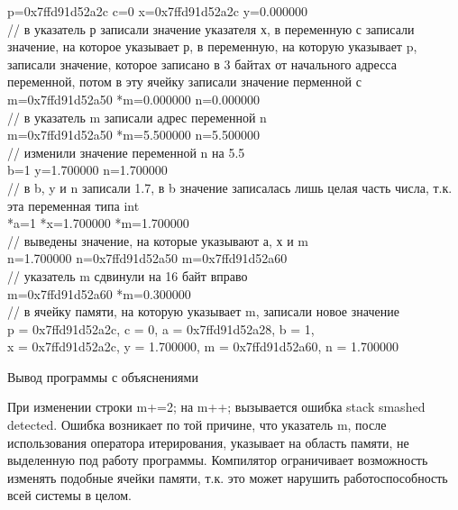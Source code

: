 \documentclass[a4paper,14pt]{extarticle}
\begin{document}
\begin{footnotesize}
p=0x7ffd91d52a2c	c=0	x=0x7ffd91d52a2c	y=0.000000\\
// в указатель р записали значение указателя х, в переменную с записали значение, на которое указывает р, в переменную, на которую указывает p, записали значение, которое записано в 3 байтах от начального адресса переменной, потом в эту ячейку записали значение перменной с\\
m=0x7ffd91d52a50	*m=0.000000	n=0.000000\\
// в указатель m записали адрес переменной n\\
m=0x7ffd91d52a50	*m=5.500000	n=5.500000\\
// изменили значение переменной n на 5.5\\
b=1	y=1.700000	n=1.700000\\
// в b, y и n записали 1.7, в b значение записалась лишь целая часть числа, т.к. эта переменная типа int\\
*a=1	*x=1.700000	*m=1.700000\\
// выведены значение, на которые указывают а, х и m\\
n=1.700000	n=0x7ffd91d52a50	m=0x7ffd91d52a60\\
// указатель m сдвинули на 16 байт вправо\\
m=0x7ffd91d52a60	*m=0.300000\\
// в ячейку памяти, на которую указывает m, записали новое значение\\
p = 0x7ffd91d52a2c, c = 0, a = 0x7ffd91d52a28, b = 1,\\
x = 0x7ffd91d52a2c, y = 1.700000, m = 0x7ffd91d52a60, n = 1.700000\\
\end{footnotesize}
\begin{center}
{\small Вывод программы с объяснениями}
\end{center}
При изменении строки m+=2; на m++; вызывается ошибка stack smashed detected. Ошибка возникает по той причине, что указатель m, после использования оператора итерирования, указывает на область памяти, не выделенную под работу программы. Компилятор ограничивает возможность изменять подобные ячейки памяти, т.к. это может нарушить работоспособность всей системы в целом.
\end{document}

